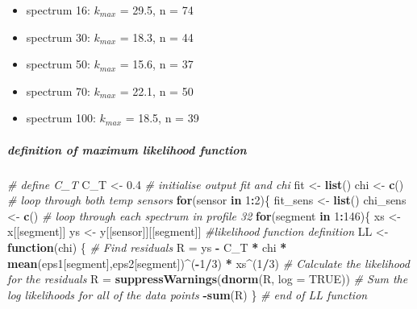 \documentclass[]{article}
\newenvironment{Shaded}{\begin{snugshade}}{\end{snugshade}}
\newcommand{\KeywordTok}[1]{\textcolor[rgb]{0.13,0.29,0.53}{\textbf{#1}}}
\newcommand{\DataTypeTok}[1]{\textcolor[rgb]{0.13,0.29,0.53}{#1}}
\newcommand{\DecValTok}[1]{\textcolor[rgb]{0.00,0.00,0.81}{#1}}
\newcommand{\FloatTok}[1]{\textcolor[rgb]{0.00,0.00,0.81}{#1}}
\newcommand{\StringTok}[1]{\textcolor[rgb]{0.31,0.60,0.02}{#1}}
\newcommand{\CommentTok}[1]{\textcolor[rgb]{0.56,0.35,0.01}{\textit{#1}}}
\newcommand{\OtherTok}[1]{\textcolor[rgb]{0.56,0.35,0.01}{#1}}
\newcommand{\ControlFlowTok}[1]{\textcolor[rgb]{0.13,0.29,0.53}{\textbf{#1}}}
\newcommand{\OperatorTok}[1]{\textcolor[rgb]{0.81,0.36,0.00}{\textbf{#1}}}
\newcommand{\NormalTok}[1]{#1}
\providecommand{\tightlist}{%
  \setlength{\itemsep}{0pt}\setlength{\parskip}{0pt}}
\let\oldsubparagraph\subparagraph
\renewcommand{\subparagraph}[1]{\oldsubparagraph{#1}\mbox{}}
\begin{document}
\begin{itemize}
\tightlist
\item
  spectrum 16: \(k_{max}\) = 29.5, n = 74
\item
  spectrum 30: \(k_{max}\) = 18.3, n = 44
\item
  spectrum 50: \(k_{max}\) = 15.6, n = 37
\item
  spectrum 70: \(k_{max}\) = 22.1, n = 50
\item
  spectrum 100: \(k_{max}\) = 18.5, n = 39
\end{itemize}

\subparagraph{definition of maximum likelihood
function}\label{definition-of-maximum-likelihood-function}

\begin{Shaded}
\begin{Highlighting}[]
\CommentTok{# define C_T}
\NormalTok{C_T <-}\StringTok{ }\FloatTok{0.4}
\CommentTok{# initialise output fit and chi}
\NormalTok{fit <-}\StringTok{ }\KeywordTok{list}\NormalTok{()}
\NormalTok{chi <-}\StringTok{ }\KeywordTok{c}\NormalTok{()}
\CommentTok{# loop through both temp sensors}
\ControlFlowTok{for}\NormalTok{(sensor }\ControlFlowTok{in} \DecValTok{1}\OperatorTok{:}\DecValTok{2}\NormalTok{)\{}
\NormalTok{  fit_sens <-}\StringTok{ }\KeywordTok{list}\NormalTok{()}
\NormalTok{  chi_sens <-}\StringTok{ }\KeywordTok{c}\NormalTok{()}
  \CommentTok{# loop through each spectrum in profile 32}
  \ControlFlowTok{for}\NormalTok{(segment }\ControlFlowTok{in} \DecValTok{1}\OperatorTok{:}\DecValTok{146}\NormalTok{)\{}
\NormalTok{    xs <-}\StringTok{ }\NormalTok{x[[segment]]}
\NormalTok{    ys <-}\StringTok{ }\NormalTok{y[[sensor]][[segment]]}
    \CommentTok{#likelihood function definition}
\NormalTok{    LL <-}\StringTok{ }\ControlFlowTok{function}\NormalTok{(chi) \{}
      \CommentTok{# Find residuals}
\NormalTok{      R =}\StringTok{ }\NormalTok{ys }\OperatorTok{-}\StringTok{ }\NormalTok{C_T }\OperatorTok{*}\StringTok{ }\NormalTok{chi }\OperatorTok{*}\StringTok{ }\KeywordTok{mean}\NormalTok{(eps1[segment],eps2[segment])}\OperatorTok{^}\NormalTok{(}\OperatorTok{-}\DecValTok{1}\OperatorTok{/}\DecValTok{3}\NormalTok{) }\OperatorTok{*}\StringTok{ }\NormalTok{xs}\OperatorTok{^}\NormalTok{(}\DecValTok{1}\OperatorTok{/}\DecValTok{3}\NormalTok{)}
      \CommentTok{# Calculate the likelihood for the residuals}
\NormalTok{      R =}\StringTok{ }\KeywordTok{suppressWarnings}\NormalTok{(}\KeywordTok{dnorm}\NormalTok{(R, }\DataTypeTok{log =} \OtherTok{TRUE}\NormalTok{))}
      \CommentTok{# Sum the log likelihoods for all of the data points}
      \OperatorTok{-}\KeywordTok{sum}\NormalTok{(R)}
\NormalTok{    \} }\CommentTok{# end of LL function}
  

\end{Highlighting}
\end{Shaded}
\end{document}
